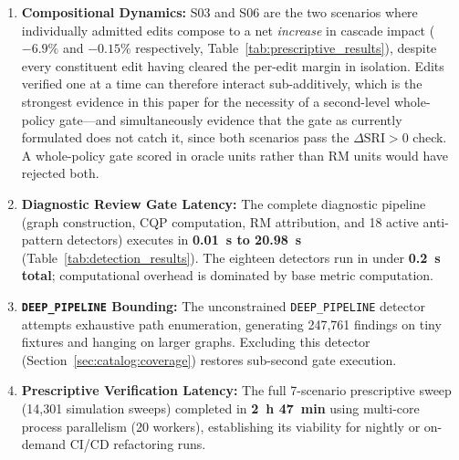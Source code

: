 \begin{enumerate}
    \item \textbf{Compositional Dynamics:} S03 and S06 are the two scenarios where individually admitted edits compose to a net \emph{increase} in cascade impact ($-6.9\%$ and $-0.15\%$ respectively, Table~\ref{tab:prescriptive_results}), despite every constituent edit having cleared the per-edit margin in isolation. Edits verified one at a time can therefore interact sub-additively, which is the strongest evidence in this paper for the necessity of a second-level whole-policy gate---and simultaneously evidence that the gate as currently formulated does not catch it, since both scenarios pass the $\Delta\mathrm{SRI} > 0$ check. A whole-policy gate scored in oracle units rather than RM units would have rejected both.
    \item \textbf{Diagnostic Review Gate Latency:} The complete diagnostic pipeline (graph construction, CQP computation, RM attribution, and 18 active anti-pattern detectors) executes in \textbf{0.01~s to 20.98~s} (Table~\ref{tab:detection_results}). The eighteen detectors run in under \textbf{0.2~s total}; computational overhead is dominated by base metric computation.
    \item \textbf{\texttt{DEEP\_PIPELINE} Bounding:} The unconstrained \texttt{DEEP\_PIPELINE} detector attempts exhaustive path enumeration, generating 247,761 findings on tiny fixtures and hanging on larger graphs. Excluding this detector (Section~\ref{sec:catalog:coverage}) restores sub-second gate execution.
    \item \textbf{Prescriptive Verification Latency:} The full 7-scenario prescriptive sweep (14,301 simulation sweeps) completed in \textbf{2~h 47~min} using multi-core process parallelism (20 workers), establishing its viability for nightly or on-demand CI/CD refactoring runs.
\end{enumerate}
